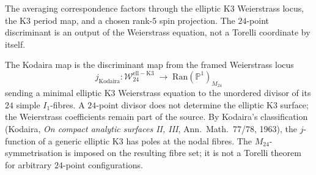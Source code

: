 The averaging correspondence factors through the elliptic K3 Weierstrass locus, the K3 period map, and a chosen rank-\(5\) spin projection. The \(24\)-point discriminant is an output of the Weierstrass equation, not a Torelli coordinate by itself.

\begin{proposition}
\label{prop:kodaira-j-step}
The Kodaira map is the discriminant map from the framed Weierstrass locus
\[
 j_{\mathrm{Kodaira}}\colon
 \mathcal{W}^{\mathrm{ell-K3}}_{24}
 \;\longrightarrow\;
 \mathrm{Ran}(\mathbb{P}^1)_{M_{24}}
\]
sending a minimal elliptic K3 Weierstrass equation to the unordered divisor of its \(24\) simple \(I_1\)-fibres. A \(24\)-point divisor does not determine the elliptic K3 surface; the Weierstrass coefficients remain part of the source. By Kodaira's classification (Kodaira, \emph{On compact analytic surfaces II, III}, Ann.~Math.~77/78, 1963), the \(j\)-function of a generic elliptic K3 has poles at the nodal fibres. The \(M_{24}\)-symmetrisation is imposed on the resulting fibre set; it is not a Torelli theorem for arbitrary \(24\)-point configurations.
\end{proposition}

